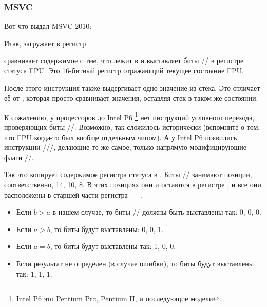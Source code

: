 \subsubsection{\NonOptimizing MSVC}

Вот что выдал MSVC 2010:



Итак, \FLD загружает  в регистр .

\label{Czero_etc}
\newcommand{\Czero}{\GTT{C0}\xspace}
\newcommand{\Ctwo}{\GTT{C2}\xspace}
\newcommand{\Cthree}{\GTT{C3}\xspace}
\newcommand{\CThreeBits}{\Cthree/\Ctwo/\Czero}

\FCOMP сравнивает содержимое  с тем, что лежит в  и выставляет биты \CThreeBits в 
регистре статуса FPU. Это 16-битный регистр отражающий текущее состояние FPU.

После этого инструкция \FCOMP также выдергивает одно значение из стека. 
Это отличает её от \FCOM, которая просто сравнивает значения, оставляя стек в таком же состоянии.

К сожалению, у процессоров до Intel P6
\footnote{Intel P6 это Pentium Pro, Pentium II, и последующие модели} нет инструкций условного перехода,
проверяющих биты \CThreeBits.
Возможно, так сложилось исторически (вспомните о том, что FPU когда-то был вообще отдельным чипом).
А у Intel P6 появились инструкции \FCOMI/\FCOMIP/\FUCOMI/\FUCOMIP, делающие то же самое, 
только напрямую модифицирующие флаги \ZF/\PF/\CF.

Так что \FNSTSW копирует содержимое регистра статуса в \AX. 
Биты \CThreeBits занимают позиции, 
соответственно, 14, 10, 8. В этих позициях они и остаются в регистре \AX, 
и все они расположены в старшей части регистра~--- \AH.

\begin{itemize}
\item Если $b>a$ в нашем случае, то биты \CThreeBits должны быть выставлены так: 0, 0, 0.
\item Если $a>b$, то биты будут выставлены: 0, 0, 1.
\item Если $a=b$, то биты будут выставлены так: 1, 0, 0.
\item Если результат не определен (в случае ошибки), то биты будут выставлены так: 1, 1, 1.
\end{itemize}

